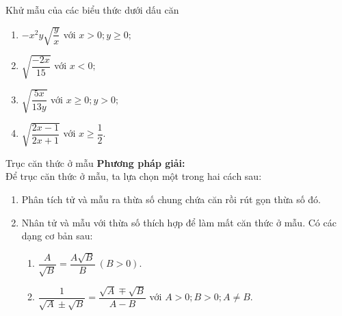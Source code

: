 \begin{vd} 
    Khử mẫu của các biểu thức dưới dấu căn
    \begin{multicols}{2}
        \begin{enumerate}
            \item $-x^2y \sqrt{\dfrac{y}{x}}$ với $x >0; y \geq 0;$
            \item $\sqrt{\dfrac{-2x}{15}}$ với $x<0;$
            \item $\sqrt{\dfrac{5x}{13y}}$ với $x \geq 0; y>0;$
            \item $\sqrt{\dfrac{2x-1}{2x+1}}$ với $x\geq \dfrac{1}{2}.$
        \end{enumerate}         
    \end{multicols}     
\end{vd}


\begin{dang}{Trục căn thức ở mẫu}
    \textbf{Phương pháp giải:}\\
    Để trục căn thức ở mẫu, ta lựa chọn một trong hai cách sau:
    \begin{enumerate}[Cách 1:] 
        \item Phân tích tử và mẫu ra thừa số chung chứa căn rồi rút gọn thừa số đó.
        \item Nhân tử và mẫu với thừa số thích hợp để làm mất căn thức ở mẫu. Có các dạng cơ bản sau:
        \begin{enumerate}[1.]
            \item $\dfrac{A}{\sqrt{B}}=\dfrac{A \sqrt{B}}{B}\ (B>0). $
            \item $\dfrac{1}{\sqrt{A}\pm \sqrt{B}}=\dfrac{\sqrt{A}\mp \sqrt{B}}{A-B}$ với $A>0;B>0;A\neq B.$
        \end{enumerate}
    \end{enumerate}
    
\end{dang}

